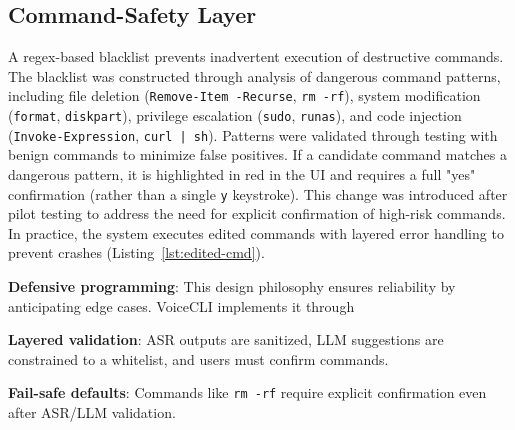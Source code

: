 \documentclass[a4paper,12pt]{article}
\begin{document}
\subsection{Command-Safety Layer}
\label{sec:command-safety}
\noindent A regex-based blacklist prevents inadvertent execution of destructive commands. The blacklist was constructed through analysis of dangerous command patterns, including file deletion (\texttt{Remove-Item -Recurse}, \texttt{rm -rf}), system modification (\texttt{format}, \texttt{diskpart}), privilege escalation (\texttt{sudo}, \texttt{runas}), and code injection (\texttt{Invoke-Expression}, \texttt{curl | sh}). Patterns were validated through testing with benign commands to minimize false positives. If a candidate command matches a dangerous pattern, it is highlighted in red in the UI and requires a full "yes" confirmation (rather than a single \texttt{y} keystroke). This change was introduced after pilot testing to address the need for explicit confirmation of high-risk commands. In practice, the system executes edited commands with layered error handling to prevent crashes (Listing~\ref{lst:edited-cmd}).
\begin{description}
    \item \textbf{Defensive programming}: This design philosophy ensures reliability by anticipating edge cases. VoiceCLI implements it through~\cite{ref25} 
    \item\textbf{Layered validation}: ASR outputs are sanitized, LLM suggestions are constrained to a whitelist, and users must confirm commands.
    \item\textbf{Fail-safe defaults}: Commands like \texttt{rm -rf} require explicit confirmation even after ASR/LLM validation.
\end{description}

\newpage
\end{document}
